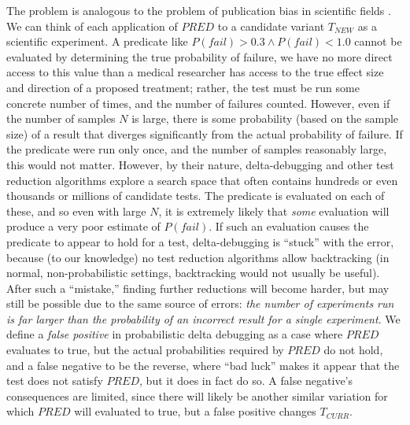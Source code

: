 The problem is analogous to the problem of publication bias in
scientific fields \cite{ahmed2012assessment}.  We can think of each
application of $\mathit{PRED}$ to a candidate variant
$T_{\mathit{NEW}}$ as a scientific experiment.  A predicate like
$P(fail) > 0.3 \wedge P(fail) < 1.0$ cannot be evaluated by
determining the true probability of failure, we have no more direct access to
this value than a medical researcher has access to the true effect
size and direction of a proposed treatment; rather, the test must be
run some concrete number of times, and the number of failures counted.
However, even if the number of samples $N$ is large, there is some
probability (based on the sample size) of a result that diverges
significantly from the actual probability of failure.  If the
predicate were run only once, and the number of samples reasonably
large, this would not matter.  However, by their nature,
delta-debugging and other test reduction algorithms explore a search
space that often contains hundreds or even thousands or millions of
candidate tests.  The predicate is evaluated on each of these, and so
even with large $N$, it is extremely likely that \emph{some} evaluation will
produce a very poor estimate of $P(fail)$.  If such an evaluation
causes the predicate to appear to hold for a test, delta-debugging is
``stuck'' with the error, because (to our knowledge) no test reduction
algorithms allow backtracking (in normal, non-probabilistic settings,
backtracking would not usually be useful).  After such a ``mistake,'' finding further
reductions will become harder, but may still be possible due to the
same source of errors:  \emph{the number of experiments run is far larger
  than the probability of an incorrect result for a single
  experiment}.  We define a \emph{false positive} in probabilistic
delta debugging as a case where $\mathit{PRED}$ evaluates to true, but
the actual probabilities required by $\mathit{PRED}$ do not hold, and
a false negative to be the reverse, where ``bad luck'' makes it appear
that the test does not satisfy $\mathit{PRED}$, but it does in fact do
so.  A false negative's consequences are limited, since there will
likely be another similar variation for which  $\mathit{PRED}$ will
evaluated to true, but a false positive changes $T_{\mathit{CURR}}$.

